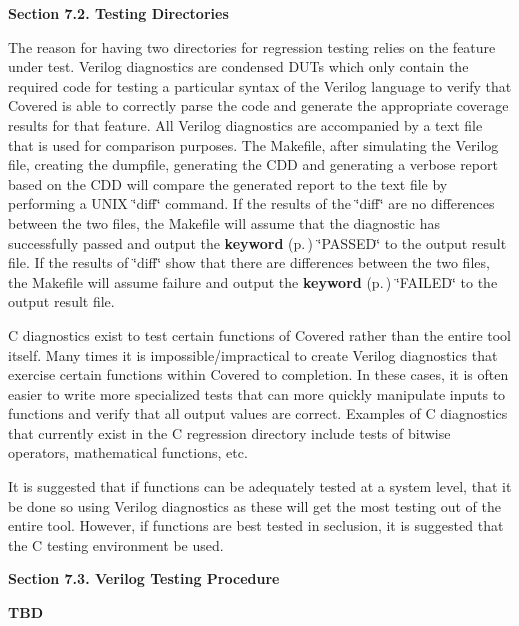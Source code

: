 \begin{Desc}
\item[{\bf Section 7.2.  Testing Directories}]\par
 The reason for having two directories for regression testing relies on the feature under test. Verilog diagnostics are condensed DUTs which only contain the required code for testing a particular syntax of the Verilog language to verify that Covered is able to correctly parse the code and generate the appropriate coverage results for that feature. All Verilog diagnostics are accompanied by a text file that is used for comparison purposes. The Makefile, after simulating the Verilog file, creating the dumpfile, generating the CDD and generating a verbose report based on the CDD will compare the generated report to the text file by performing a UNIX \char`\"{}diff\char`\"{} command. If the results of the \char`\"{}diff\char`\"{} are no differences between the two files, the Makefile will assume that the diagnostic has successfully passed and output the {\bf keyword} {\rm (p.\,\pageref{structkeyword})} \char`\"{}PASSED\char`\"{} to the output result file. If the results of \char`\"{}diff\char`\"{} show that there are differences between the two files, the Makefile will assume failure and output the {\bf keyword} {\rm (p.\,\pageref{structkeyword})} \char`\"{}FAILED\char`\"{} to the output result file.

 C diagnostics exist to test certain functions of Covered rather than the entire tool itself. Many times it is impossible/impractical to create Verilog diagnostics that exercise certain functions within Covered to completion. In these cases, it is often easier to write more specialized tests that can more quickly manipulate inputs to functions and verify that all output values are correct. Examples of C diagnostics that currently exist in the C  regression directory include tests of bitwise operators, mathematical functions, etc.

 It is suggested that if functions can be adequately tested at a system level, that it be done so using Verilog diagnostics as these will get the most testing out of the entire tool. However, if functions are best tested in seclusion, it is suggested that the C testing environment be used.

\end{Desc}


\begin{Desc}
\item[{\bf Section 7.3.  Verilog Testing Procedure}]\par
 {\bf TBD}

\end{Desc}


